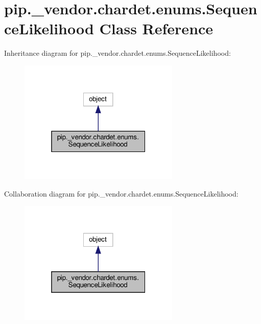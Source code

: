 \hypertarget{classpip_1_1__vendor_1_1chardet_1_1enums_1_1SequenceLikelihood}{}\section{pip.\+\_\+vendor.\+chardet.\+enums.\+Sequence\+Likelihood Class Reference}
\label{classpip_1_1__vendor_1_1chardet_1_1enums_1_1SequenceLikelihood}


Inheritance diagram for pip.\+\_\+vendor.\+chardet.\+enums.\+Sequence\+Likelihood\+:
\nopagebreak
\begin{figure}[H]
\begin{center}
\leavevmode
\includegraphics[width=217pt]{classpip_1_1__vendor_1_1chardet_1_1enums_1_1SequenceLikelihood__inherit__graph}
\end{center}
\end{figure}


Collaboration diagram for pip.\+\_\+vendor.\+chardet.\+enums.\+Sequence\+Likelihood\+:
\nopagebreak
\begin{figure}[H]
\begin{center}
\leavevmode
\includegraphics[width=217pt]{classpip_1_1__vendor_1_1chardet_1_1enums_1_1SequenceLikelihood__coll__graph}
\end{center}
\end{figure}
